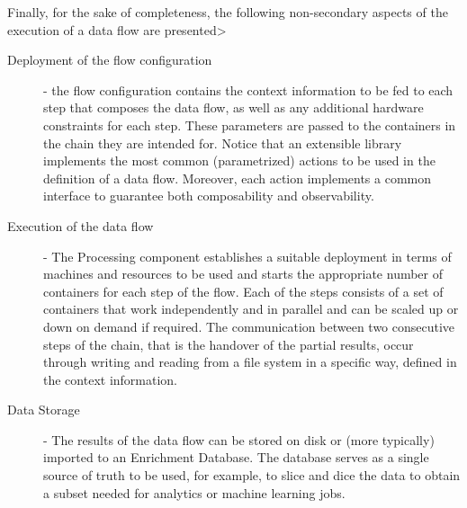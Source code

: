  
Finally, for the sake of completeness, the following non-secondary aspects of the execution of a data flow are presented>
\begin{description}
    \item[Deployment of the flow configuration] - the flow configuration contains the context information to be fed to each step that composes the data flow, as well as any additional hardware constraints for each step. These parameters are passed to the containers in the chain they are intended for. Notice that an extensible library implements the most common (parametrized) actions to be used in the definition of a data flow. Moreover, each action implements a common interface to guarantee both composability and observability. 
    
    \item[Execution of the data flow] - The Processing component establishes a suitable deployment in terms of machines and resources to be used and starts the appropriate number of containers for each step of the flow.  Each of the steps consists of a set of containers that work independently and in parallel and can be scaled up or down on demand if required. The communication between two consecutive steps of the chain, that is the handover of the partial results, occur through writing and reading from a file system in a specific way, defined in the context information.
    \item[Data Storage] - The results of the data flow can be stored on disk or (more typically) imported to an Enrichment Database. The database serves as a single source of truth to be used, for example, to slice and dice the data to obtain a subset needed for analytics or machine learning jobs. 
\end{description} 
